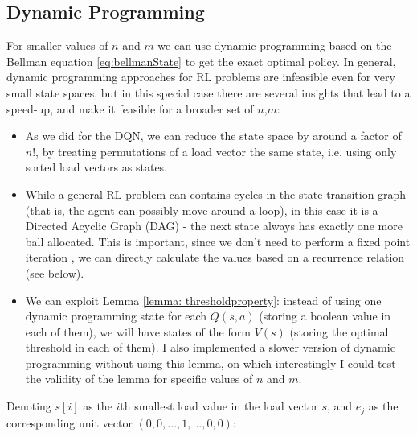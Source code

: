 
\subsection{Dynamic Programming}


For smaller values of $n$ and $m$ we can use dynamic programming based on the Bellman equation \ref{eq:bellmanState} to get the exact optimal policy. In general, dynamic programming approaches for RL problems are infeasible even for very small state spaces, but in this special case there are several insights that lead to a speed-up, and make it feasible for a broader set of $n$,$m$:


\begin{itemize}
    \item 
    As we did for the DQN, we can reduce the state space by around a factor of $n!$, by treating permutations of a load vector the same state, i.e. using only sorted load vectors as states.
    \item
    While a general RL problem can contains cycles in the state transition graph (that is, the agent can possibly move around a loop), in this case it is a Directed Acyclic Graph (DAG) - the next state always has exactly one more ball allocated. This is important, since we don't need to perform a fixed point iteration \cite{rhoades1991fixedpointiteration}, we can directly calculate the values based on a recurrence relation (see below).
    \item
    We can exploit Lemma \ref{lemma: thresholdproperty}: instead of using one dynamic programming state for each $Q(s,a)$ (storing a boolean value in each of them), we will have states of the form $V(s)$ (storing the optimal threshold in each of them). I also implemented a slower version of dynamic programming without using this lemma, on which interestingly I could test the validity of the lemma for specific values of $n$ and $m$.
\end{itemize}


Denoting $s[i]$ as the $i$th smallest load value in the load vector $s$, and $e_j$ as the corresponding unit vector $(0, 0, ... , 1, ..., 0, 0)$: 

